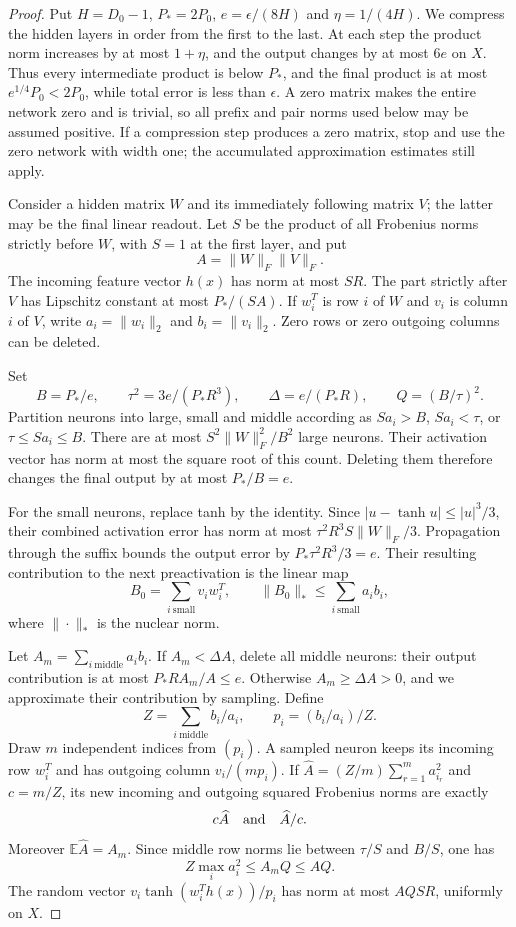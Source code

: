 \begin{proof}
Put $H=D_0-1$, $P_*=2P_0$, $e=\epsilon/(8H)$ and
$\eta=1/(4H)$. We compress the hidden layers in order from the first
to the last. At each step the product norm increases by at most
$1+\eta$, and the output changes by at most $6e$ on $X$.
Thus every intermediate product is below $P_*$, and the final product
is at most $e^{1/4}P_0<2P_0$, while total error is less than $\epsilon$.
A zero matrix makes the entire network zero and is trivial, so all
prefix and pair norms used below may be assumed positive. If a
compression step produces a zero matrix, stop and use the zero network
with width one; the accumulated approximation estimates still apply.

Consider a hidden matrix $W$ and its immediately following matrix $V$;
the latter may be the final linear readout. Let $S$ be the product of
all Frobenius norms strictly before $W$, with $S=1$ at the first layer,
and put
\[
 A=\|W\|_F\|V\|_F.
\]
The incoming feature vector $h(x)$ has norm at most $SR$. The part
strictly after $V$ has Lipschitz constant at most $P_*/(SA)$.
If $w_i^T$ is row $i$ of $W$ and $v_i$ is column $i$ of $V$, write
$a_i=\|w_i\|_2$ and $b_i=\|v_i\|_2$.
Zero rows or zero outgoing columns can be deleted.

Set
\[
 B=P_*/e,\qquad \tau^2=3e/(P_*R^3),\qquad
 \Delta=e/(P_*R),\qquad Q=(B/\tau)^2.
\]
Partition neurons into large, small and middle according as
$Sa_i>B$, $Sa_i<\tau$, or $\tau\le Sa_i\le B$.
There are at most $S^2\|W\|_F^2/B^2$ large neurons. Their activation
vector has norm at most the square root of this count. Deleting them
therefore changes the final output by at most $P_*/B=e$.

For the small neurons, replace tanh by the identity. Since
$|u-\tanh u|\le |u|^3/3$, their combined activation error has norm at
most $\tau^2R^3S\|W\|_F/3$. Propagation through the suffix bounds
the output error by $P_*\tau^2R^3/3=e$.
Their resulting contribution to the next preactivation is the linear map
\[
 B_0=\sum_{i\ \mathrm{small}}v_iw_i^T,
 \qquad \|B_0\|_*\le\sum_{i\ \mathrm{small}}a_ib_i,
\]
where $\|\cdot\|_*$ is the nuclear norm.

Let $A_m=\sum_{i\ \mathrm{middle}}a_ib_i$.
If $A_m<\Delta A$, delete all middle neurons: their output contribution
is at most $P_*R A_m/A\le e$. Otherwise $A_m\ge\Delta A>0$, and
we approximate their contribution by sampling. Define
\[
 Z=\sum_{i\ \mathrm{middle}}b_i/a_i,
 \qquad p_i=(b_i/a_i)/Z.
\]
Draw $m$ independent indices from $(p_i)$. A sampled neuron keeps its
incoming row $w_i^T$ and has outgoing column $v_i/(mp_i)$.
If $\widehat A=(Z/m)\sum_{r=1}^m a_{i_r}^2$ and $c=m/Z$, its new
incoming and outgoing squared Frobenius norms are exactly
\[
 c\widehat A\quad\hbox{and}\quad \widehat A/c.
\]
Moreover $\mathbb E\widehat A=A_m$. Since middle row norms lie between
$\tau/S$ and $B/S$, one has
\[
 Z\max_i a_i^2\le A_m Q\le AQ.
\]
The random vector $v_i\tanh(w_i^Th(x))/p_i$ has norm at most
$AQSR$, uniformly on $X$.


\end{proof}
